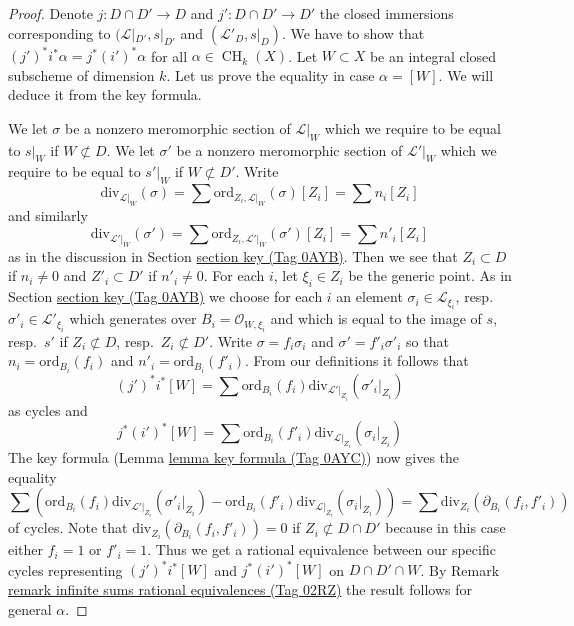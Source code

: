 \documentclass{amsart}
\theoremstyle{plain}
\theoremstyle{definition}
\theoremstyle{remark}
\numberwithin{equation}{subsection}
\def\CH{\mathop{\mathrm{CH}}\nolimits}
\begin{document}
\begin{proof}
Denote $j : D \cap D' \to D$ and $j' : D \cap D' \to D'$ the closed
immersions corresponding to $(\mathcal{L}|_{D'}, s|_{D'}$ and
$(\mathcal{L}'_D, s|_D)$. We have to show that
$(j')^*i^*\alpha = j^* (i')^*\alpha$ for all $\alpha \in \CH_k(X)$.
Let $W \subset X$ be an integral closed subscheme of dimension $k$.
Let us prove the equality in case $\alpha = [W]$. We will deduce
it from the key formula.

\medskip\noindent
We let $\sigma$ be a nonzero meromorphic section of $\mathcal{L}|_W$
which we require to be equal to $s|_W$ if $W \not \subset D$.
We let $\sigma'$ be a nonzero meromorphic section of $\mathcal{L}'|_W$
which we require to be equal to $s'|_W$ if $W \not \subset D'$.
Write
$$
\text{div}_{\mathcal{L}|_W}(\sigma) =
\sum \text{ord}_{Z_i, \mathcal{L}|_W}(\sigma)[Z_i] = \sum n_i[Z_i]
$$
and similarly
$$
\text{div}_{\mathcal{L}'|_W}(\sigma') =
\sum \text{ord}_{Z_i, \mathcal{L}'|_W}(\sigma')[Z_i] = \sum n'_i[Z_i]
$$
as in the discussion in Section \href{https://stacks.math.columbia.edu/tag/0AYB}{section key (Tag 0AYB)}.
Then we see that $Z_i \subset D$ if $n_i \not = 0$ and
$Z'_i \subset D'$ if $n'_i \not = 0$. For each $i$, let $\xi_i \in Z_i$
be the generic point. As in Section \href{https://stacks.math.columbia.edu/tag/0AYB}{section key (Tag 0AYB)} we choose
for each $i$ an element
$\sigma_i \in \mathcal{L}_{\xi_i}$, resp.\ $\sigma'_i \in \mathcal{L}'_{\xi_i}$
which generates over $B_i = \mathcal{O}_{W, \xi_i}$
and which is equal to the image of
$s$, resp.\ $s'$ if $Z_i \not \subset D$, resp.\ $Z_i \not \subset D'$.
Write $\sigma = f_i \sigma_i$ and $\sigma' = f'_i\sigma'_i$ so that
$n_i = \text{ord}_{B_i}(f_i)$ and
$n'_i = \text{ord}_{B_i}(f'_i)$.
From our definitions it follows that
$$
(j')^*i^*[W] =
\sum \text{ord}_{B_i}(f_i) \text{div}_{\mathcal{L}'|_{Z_i}}(\sigma'_i|_{Z_i})
$$
as cycles and
$$
j^*(i')^*[W] =
\sum \text{ord}_{B_i}(f'_i) \text{div}_{\mathcal{L}|_{Z_i}}(\sigma_i|_{Z_i})
$$
The key formula (Lemma \href{https://stacks.math.columbia.edu/tag/0AYC}{lemma key formula (Tag 0AYC)}) now gives the equality
$$
\sum \left(
\text{ord}_{B_i}(f_i) \text{div}_{\mathcal{L}'|_{Z_i}}(\sigma'_i|_{Z_i}) -
\text{ord}_{B_i}(f'_i) \text{div}_{\mathcal{L}|_{Z_i}}(\sigma_i|_{Z_i})
\right) =
\sum \text{div}_{Z_i}(\partial_{B_i}(f_i, f'_i))
$$
of cycles. Note that $\text{div}_{Z_i}(\partial_{B_i}(f_i, f'_i)) = 0$ if
$Z_i \not \subset D \cap D'$ because in this case either $f_i = 1$
or $f'_i = 1$. Thus we get a rational equivalence between our specific
cycles representing $(j')^*i^*[W]$ and $j^*(i')^*[W]$ on $D \cap D' \cap W$.
By Remark \href{https://stacks.math.columbia.edu/tag/02RZ}{remark infinite sums rational equivalences (Tag 02RZ)}
the result follows for general $\alpha$.
\end{proof}
\end{document}
